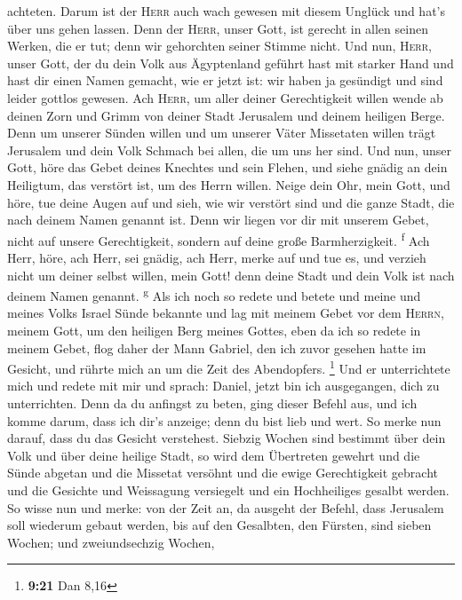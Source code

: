 achteten.  Darum ist der \textsc{Herr} auch wach gewesen
mit diesem Unglück und hat's über uns gehen lassen. Denn der
\textsc{Herr}, unser Gott, ist gerecht in allen seinen Werken, die er
tut; denn wir gehorchten seiner Stimme nicht.  Und nun,
\textsc{Herr}, unser Gott, der du dein Volk aus Ägyptenland geführt hast
mit starker Hand und hast dir einen Namen gemacht, wie er jetzt ist: wir
haben ja gesündigt und sind leider gottlos gewesen.  Ach
\textsc{Herr}, um aller deiner Gerechtigkeit willen wende ab deinen Zorn
und Grimm von deiner Stadt Jerusalem und deinem heiligen Berge. Denn um
unserer Sünden willen und um unserer Väter Missetaten willen trägt
Jerusalem und dein Volk Schmach bei allen, die um uns her sind.
 Und nun, unser Gott, höre das Gebet deines Knechtes und
sein Flehen, und siehe gnädig an dein Heiligtum, das verstört ist, um
des Herrn willen.  Neige dein Ohr, mein Gott, und höre,
tue deine Augen auf und sieh, wie wir verstört sind und die ganze Stadt,
die nach deinem Namen genannt ist. Denn wir liegen vor dir mit unserem
Gebet, nicht auf unsere Gerechtigkeit, sondern auf deine große
Barmherzigkeit. \textsuperscript{f}  Ach Herr, höre, ach
Herr, sei gnädig, ach Herr, merke auf und tue es, und verzieh nicht um
deiner selbst willen, mein Gott! denn deine Stadt und dein Volk ist nach
deinem Namen genannt. \textsuperscript{g}  Als ich noch
so redete und betete und meine und meines Volks Israel Sünde bekannte
und lag mit meinem Gebet vor dem \textsc{Herrn}, meinem Gott, um den
heiligen Berg meines Gottes,  eben da ich so redete in
meinem Gebet, flog daher der Mann Gabriel, den ich zuvor gesehen hatte
im Gesicht, und rührte mich an um die Zeit des Abendopfers. \footnote{\textbf{9:21}
  Dan 8,16}  Und er unterrichtete mich und redete mit mir
und sprach: Daniel, jetzt bin ich ausgegangen, dich zu unterrichten.
 Denn da du anfingst zu beten, ging dieser Befehl aus,
und ich komme darum, dass ich dir's anzeige; denn du bist lieb und wert.
So merke nun darauf, dass du das Gesicht verstehest. 
Siebzig Wochen sind bestimmt über dein Volk und über deine heilige
Stadt, so wird dem Übertreten gewehrt und die Sünde abgetan und die
Missetat versöhnt und die ewige Gerechtigkeit gebracht und die Gesichte
und Weissagung versiegelt und ein Hochheiliges gesalbt werden.
 So wisse nun und merke: von der Zeit an, da ausgeht der
Befehl, dass Jerusalem soll wiederum gebaut werden, bis auf den
Gesalbten, den Fürsten, sind sieben Wochen; und zweiundsechzig Wochen,
